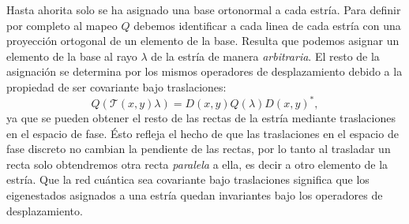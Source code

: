 \documentclass[a4paper]{report}
\begin{document}
  Hasta ahorita solo se ha asignado una base ortonormal a
  cada estría. Para definir por completo al mapeo $Q$
  debemos identificar a cada linea de cada estría con una
  proyección ortogonal de un elemento de la base. Resulta
  que podemos asignar un elemento de la base al rayo
  $\lambda$ de la estría de manera \textit{arbitraria}. El
  resto de la asignación se determina por los mismos
  operadores de desplazamiento debido a la propiedad de ser
  covariante bajo traslaciones:
  \[
    Q(\mathcal T(x,y) \lambda)
    = D(x,y) Q(\lambda) D(x,y)^{*},
  \] 
  ya que se pueden obtener el resto de las rectas de la
  estría mediante traslaciones en el espacio de fase. Ésto
  refleja el hecho de que las traslaciones en el espacio
  de fase discreto no cambian la pendiente de las rectas,
  por lo tanto al trasladar un recta solo obtendremos otra
  recta \textit{paralela} a ella, es decir a otro elemento
  de la estría. Que la red cuántica sea covariante bajo
  traslaciones significa que los eigenestados asignados a
  una estría quedan invariantes bajo los operadores de
  desplazamiento. 
\end{document}
